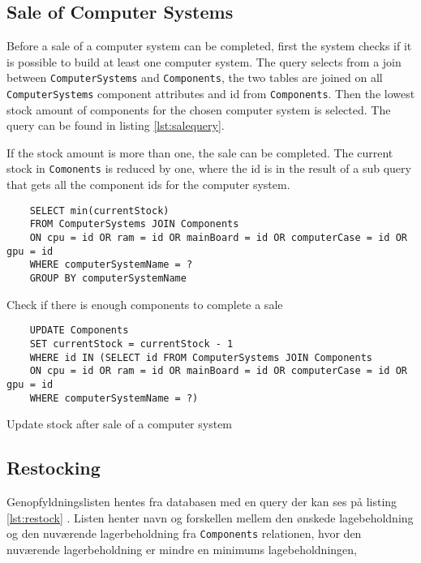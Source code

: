 \documentclass[12pt,a4paper]{article}
\begin{document}
\subsection{Sale of Computer Systems}
Before a sale of a computer system can be completed, first the system checks if it is possible to build at least one computer system. 
The query selects from a join between \texttt{ComputerSystems} and \texttt{Components}, the two tables are joined on all \texttt{ComputerSystems} component attributes and id from \texttt{Components}. 
Then the lowest stock amount of components for the chosen computer system is selected. 
The query can be found in listing \ref{lst:salequery}.

If the stock amount is more than one, the sale can be completed. 
The current stock in \texttt{Comonents} is reduced by one, where the id is in the result of a sub query that gets all the component ids for the computer system.

\begin{listing}[!htbp]
    \begin{verbatim}
    SELECT min(currentStock)
    FROM ComputerSystems JOIN Components 
    ON cpu = id OR ram = id OR mainBoard = id OR computerCase = id OR gpu = id
    WHERE computerSystemName = ?
    GROUP BY computerSystemName
    \end{verbatim}
    \caption{Check if there is enough components to complete a sale}
    \label{lst:salequery}
\end{listing}

\begin{listing}[!htbp]
	\begin{verbatim}
    UPDATE Components
    SET currentStock = currentStock - 1
    WHERE id IN (SELECT id FROM ComputerSystems JOIN Components
    ON cpu = id OR ram = id OR mainBoard = id OR computerCase = id OR gpu = id
    WHERE computerSystemName = ?)
	\end{verbatim}
	\caption{Update stock after sale of a computer system}
\label{lst:saleupdate}
\end{listing}

\subsection{Restocking}
Genopfyldningslisten hentes fra databasen med en query der kan ses på listing \ref{lst:restock}
. Listen henter navn og forskellen mellem den ønskede lagebeholdning og den nuværende lagerbeholdning fra \texttt{Components} relationen, hvor den nuværende lagerbeholdning er mindre en minimums lagebeholdningen,
\end{document}
